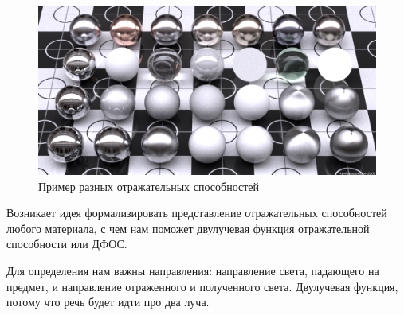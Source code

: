 \documentclass[12pt]{article}
\begin{document}
\begin{figure}[h]
  \centering
  \includegraphics[scale=0.3]{tex/brdf.png}
  \caption{Пример разных отражательных способностей}
  \label{brdf}
\end{figure}

Возникает идея формализировать представление отражательных способностей любого материала,
с чем нам поможет двулучевая функция отражательной способности или ДФОС.

Для определения нам важны направления: направление света, падающего на предмет, и направление
отраженного и полученного света. Двулучевая функция, потому что речь будет идти про два луча.
\end{document}
